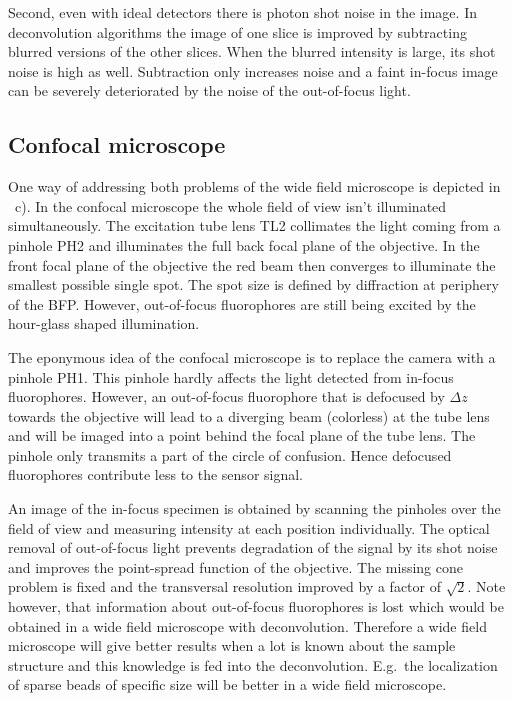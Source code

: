Second, even with ideal detectors there is photon shot noise in the
image. In deconvolution algorithms the image of one slice is improved
by subtracting blurred versions of the other slices. When the blurred
intensity is large, its shot noise is high as well. Subtraction only
increases noise and a faint in-focus image can be severely
deteriorated by the noise of the out-of-focus light.
\subsection{Confocal microscope}
One way of addressing both problems of the wide field microscope is
depicted in ~c). In the confocal
microscope the whole field of view isn't illuminated simultaneously.
The excitation tube lens TL2 collimates the light coming from a
pinhole PH2 and illuminates the full back focal plane of the
objective. In the front focal plane of the objective the red beam then
converges to illuminate the smallest possible single spot. The spot
size is defined by diffraction at periphery of the BFP. However,
out-of-focus fluorophores are still being excited by the hour-glass
shaped illumination.

The eponymous idea of the confocal microscope is to replace the camera
with a pinhole PH1. This pinhole hardly affects the light detected
from in-focus fluorophores. However, an out-of-focus fluorophore that
is defocused by $\Delta z$ towards the objective will lead to a
diverging beam (colorless) at the tube lens and will be imaged into a
point behind the focal plane of the tube lens. The pinhole only
transmits a part of the circle of confusion. Hence defocused
fluorophores contribute less to the sensor signal.

An image of the in-focus specimen is obtained by scanning the pinholes
over the field of view and measuring intensity at each position
individually. The optical removal of out-of-focus light prevents
degradation of the signal by its shot noise and improves the
point-spread function of the objective. The missing cone problem is
fixed and the transversal resolution improved by a factor of $\sqrt
2$. Note however, that information about out-of-focus fluorophores is
lost which would be obtained in a wide field microscope with
deconvolution. Therefore a wide field microscope will give better
results when a lot is known about the sample structure and this
knowledge is fed into the deconvolution. E.g.\ the localization of
sparse beads of specific size will be better in a wide field
microscope.

